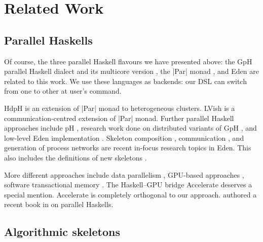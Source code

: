 \section{Related Work}
\label{sec:related-work}


\subsection{Parallel Haskells}
Of course, the three parallel Haskell flavours we have presented above: the GpH \cite{Trinder1996,Trinder1998a} parallel Haskell dialect and its multicore version \cite{Marlow2009}, the |Par| monad \cite{par-monad,Foltzer:2012:MPC:2398856.2364562}, and Eden \cite{eden,Loogen2012} are related to this work. We use these languages as backends: our DSL can switch from one to other at user's command.

HdpH \cite{Maier:2014:HDS:2775050.2633363,stewart_maier_trinder_2016} is an extension of |Par| monad to heterogeneous clusters. LVish \cite{Kuper:2014:TPE:2666356.2594312} is a communication-centred extension of |Par| monad.
%
Further parallel Haskell approaches include pH \cite{ph-book}, research work done on distributed variants of GpH \cite{Trinder1996,Aljabri:2013:DIG:2620678.2620682,Aljabri2015}, and low-level Eden implementation \cite{JostThesis,berthold_loidl_hammond_2016}. Skeleton composition \cite{dieterle_horstmeyer_loogen_berthold_2016}, communication \cite{Dieterle2010}, and generation of process networks \cite{Horstmeyer2013} are recent in-focus research topics in Eden. This also includes the definitions of new skeletons \cite{doi:10.1142/S0129626403001380,Eden:PARCO05,Berthold2009-mr,Berthold2009-fft,dieterle2010skeleton,delaEncina2011,Dieterle2013,janjic2013space}.

More different approaches include data parallelism \cite{Chakravarty2007,Keller:2010:RSP:1932681.1863582}, GPU-based approaches \cite{Mainland:2010:NEC:2088456.1863533,obsidian-phd}, software transactional memory \cite{Harris:2005:CMT:1065944.1065952,Perfumo:2008:LST:1366230.1366241}.
%
The Haskell--GPU bridge Accelerate \cite{Chakravarty:2011:AHA:1926354.1926358,CMCK14,McDonell:2015:TRC:2887747.2804313} deserves a special mention. Accelerate is completely orthogonal to our approach. \citeauthor{marlow2013parallel} authored a recent book in \citeyear{marlow2013parallel} on parallel Haskells.

\subsection{Algorithmic skeletons}

